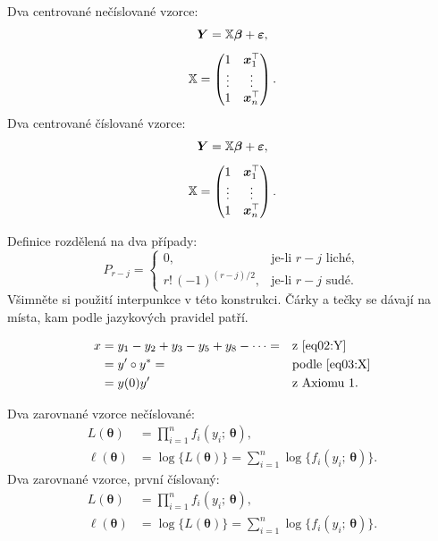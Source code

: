 Dva centrované nečíslované vzorce:
\begin{gather*}
      \bm Y = \mathbb{X}\bm\beta + \bm\varepsilon, \\[1ex]
      \mathbb{X} = \begin{pmatrix} 1 & \bm x_1^\top \\ \vdots & \vdots \\ 1 &
                \bm x_n^\top\end{pmatrix}.
\end{gather*}
Dva centrované číslované vzorce:
\begin{gather}
      \bm Y = \mathbb{X}\bm\beta + \bm\varepsilon, \label{eq02:Y}\\[1ex]
      \mathbb{X} = \begin{pmatrix} 1 & \bm x_1^\top \label{eq03:X} \\ \vdots & \vdots \\ 1 &
                \bm x_n^\top\end{pmatrix}.
\end{gather}

Definice rozdělená na dva případy:
\[
      P_{r-j}=
      \begin{cases}
            0,                  & \text{je-li $r-j$ liché}, \\
            r!\,(-1)^{(r-j)/2}, & \text{je-li $r-j$ sudé}.
      \end{cases}
\]
Všimněte si použití interpunkce v této konstrukci. Čárky a tečky se
dávají na místa, kam podle jazykových pravidel patří.

\begin{align}
      x & = y_1-y_2+y_3-y_5+y_8-\dots = &  & \text{z \eqref{eq02:Y}} \nonumber     \\
        & = y'\circ y^* =               &  & \text{podle \eqref{eq03:X}} \nonumber \\
        & = y(0) y'                     &  & \text {z Axiomu 1.}
\end{align}


Dva zarovnané vzorce nečíslované:
\begin{align*}
      L(\bm\theta)    & = \prod_{i=1}^n f_i(y_i;\,\bm\theta), \\
      \ell(\bm\theta) & = \log\bigl\{L(\bm\theta)\bigr\} =
      \sum_{i=1}^n \log\bigl\{f_i(y_i;\,\bm\theta)\bigr\}.
\end{align*}
Dva zarovnané vzorce, první číslovaný:
\begin{align}
      L(\bm\theta)    & = \prod_{i=1}^n f_i(y_i;\,\bm\theta), \label{eq01:L} \\
      \ell(\bm\theta) & = \log\bigl\{L(\bm\theta)\bigr\} =
      \sum_{i=1}^n \log\bigl\{f_i(y_i;\,\bm\theta)\bigr\}. \nonumber
\end{align}

